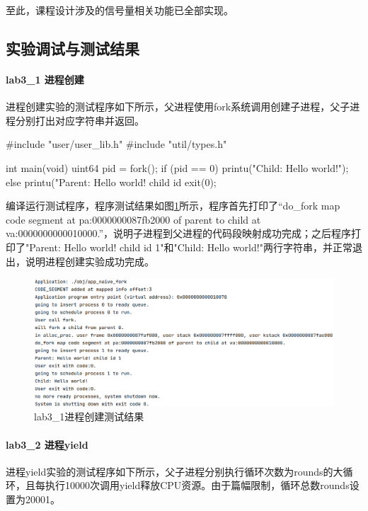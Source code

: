 至此，课程设计涉及的信号量相关功能已全部实现。
\subsection{实验调试与测试结果}
\paragraph{lab3_1 进程创建} 进程创建实验的测试程序如下所示，父进程使用fork系统调用创建子进程，父子进程分别打出对应字符串并返回。
\begin{cppcode}
#include "user/user_lib.h"
#include "util/types.h"

int main(void) {
  uint64 pid = fork();
  if (pid == 0) {
    printu("Child: Hello world!\n");
  } else {
    printu("Parent: Hello world! child id %
  }
  exit(0);
}
\end{cppcode}

编译运行测试程序，程序测试结果如图\ref{fig:lab3-1-testres}所示，程序首先打印了“do_fork map code segment at pa:0000000087fb2000 of parent to child at va:0000000000010000.”，说明子进程到父进程的代码段映射成功完成；之后程序打印了"Parent: Hello world! child id 1"和"Child: Hello world!"两行字符串，并正常退出，说明进程创建实验成功完成。
\begin{figure}[!htbp]
    \centering
    \includegraphics[width = 13cm]{figure/lab3_1_testresult.png}
    \caption{lab3_1进程创建测试结果}
    \label{fig:lab3-1-testres}
\end{figure}

\paragraph{lab3_2 进程yield}
进程yield实验的测试程序如下所示，父子进程分别执行循环次数为rounds的大循环，且每执行10000次调用yield释放CPU资源。由于篇幅限制，循环总数rounds设置为20001。

